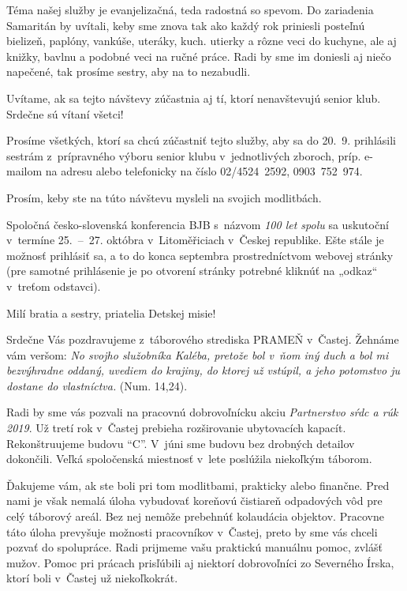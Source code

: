 Téma našej služby je evanjelizačná, teda radostná so spevom. Do zariadenia Samaritán by uvítali, keby sme znova tak ako každý rok priniesli posteľnú bielizeň, paplóny, vankúše, uteráky, kuch. utierky a rôzne veci do kuchyne, ale aj knižky, bavlnu a podobné veci na ručné práce. Radi by sme im doniesli aj niečo napečené, tak prosíme sestry, aby na to nezabudli.

Uvítame, ak sa tejto návštevy zúčastnia aj tí, ktorí nenavštevujú senior klub. Srdečne sú vítaní všetci!

Prosíme všetkých, ktorí sa chcú zúčastniť tejto služby, aby sa do 20.~9. prihlásili sestrám z~prípravného výboru senior klubu v~jednotlivých zboroch, príp. e-mailom na adresu  alebo telefonicky na číslo 02/4524~2592, 0903~752~974.

Prosím, keby ste na túto návštevu mysleli na svojich modlitbách.



Spoločná česko-slovenská konferencia BJB s~názvom {\it 100 let spolu} sa uskutoční v~termíne 25.~--~27. októbra v~Litoměřiciach v~Českej republike.
Ešte stále je možnosť prihlásiť sa, a to do konca septembra prostredníctvom webovej stránky \hbox{} (pre samotné prihlásenie je po otvorení stránky potrebné kliknúť na „odkaz“ v~treťom odstavci).


Milí bratia a sestry, priatelia Detskej misie!

Srdečne Vás pozdravujeme z~táborového strediska PRAMEŇ v~Častej. Žehnáme vám veršom: {\it No svojho služobníka Kaléba, pretože bol v~ňom iný duch a bol mi bezvýhradne oddaný, uvediem do krajiny, do ktorej už vstúpil, a jeho potomstvo ju dostane do vlastníctva.} (Num. 14,24).

Radi by sme vás pozvali na pracovnú dobrovoľnícku akciu {\it Partnerstvo sŕdc a rúk 2019}. Už tretí rok v~Častej prebieha rozširovanie ubytovacích kapacít. Rekonštruujeme budovu “C”. V~júni sme budovu bez drobných detailov dokončili. Veľká spoločenská miestnosť v~lete poslúžila niekoľkým táborom.

Ďakujeme vám, ak ste boli pri tom modlitbami, prakticky alebo finančne. Pred nami je však nemalá úloha vybudovať koreňovú čistiareň odpadových vôd pre celý táborový areál. Bez nej nemôže prebehnúť kolaudácia objektov. Pracovne táto úloha prevyšuje možnosti pracovníkov v~Častej, preto by sme vás chceli pozvať do spolupráce. Radi prijmeme vašu praktickú manuálnu pomoc, zvlášť mužov. Pomoc pri prácach prisľúbili aj niektorí dobrovoľníci zo Severného Írska, ktorí boli v~Častej už niekoľkokrát.

